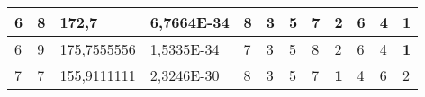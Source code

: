 \documentclass[conference]{IEEEtran}
\begin{document}
\begin{table*}[]
\begin{tabular}{|llll|llllllll|}
\multicolumn{1}{|l|}{6}                                                              & \multicolumn{1}{l|}{8}                                                                 & \multicolumn{1}{l|}{172,7}                                                                 & 6,7664E-34                              & \multicolumn{1}{l|}{8}                                                           & \multicolumn{1}{l|}{3}                                                           & \multicolumn{1}{l|}{5}                                                           & \multicolumn{1}{l|}{7}                                                           & \multicolumn{1}{l|}{2}                                                           & \multicolumn{1}{l|}{6}                                                           & \multicolumn{1}{l|}{4}                                                           & \textbf{1}                          \\ \hline
\multicolumn{1}{|l|}{6}                                                              & \multicolumn{1}{l|}{9}                                                                 & \multicolumn{1}{l|}{175,7555556}                                                           & 1,5335E-34                              & \multicolumn{1}{l|}{7}                                                           & \multicolumn{1}{l|}{3}                                                           & \multicolumn{1}{l|}{5}                                                           & \multicolumn{1}{l|}{8}                                                           & \multicolumn{1}{l|}{2}                                                           & \multicolumn{1}{l|}{6}                                                           & \multicolumn{1}{l|}{4}                                                           & \textbf{1}                          \\ \hline
\multicolumn{1}{|l|}{7}                                                              & \multicolumn{1}{l|}{7}                                                                 & \multicolumn{1}{l|}{155,9111111}                                                           & 2,3246E-30                              & \multicolumn{1}{l|}{8}                                                           & \multicolumn{1}{l|}{3}                                                           & \multicolumn{1}{l|}{5}                                                           & \multicolumn{1}{l|}{7}                                                           & \multicolumn{1}{l|}{\textbf{1}}                                                  & \multicolumn{1}{l|}{4}                                                           & \multicolumn{1}{l|}{6}                                                           & 2                                   \\ \hline

\end{tabular}
\end{table*}
\end{document}
